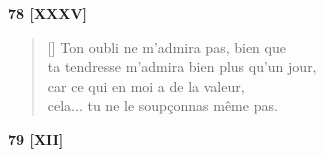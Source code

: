 \documentclass[a4paper,12pt]{book}
\begin{document}
\bigskip

\begin{center}
  \textbf{78 [XXXV]}
\end{center}

\settowidth{\versewidth}{Ton oubli ne m'admira pas! Bien que d'un jour}

\begin{verse}[\versewidth]
  Ton oubli ne m'admira pas, bien que \\
  ta tendresse m'admira bien plus qu'un jour, \\
  car ce qui en moi a de la valeur, \\
  cela... tu ne le soupçonnas même pas.
\end{verse}

\bigskip

\begin{center}
  \textbf{79 [XII]}
\end{center}

\settowidth{\versewidth}{Petite, parce que tes yeux}
\end{document}
